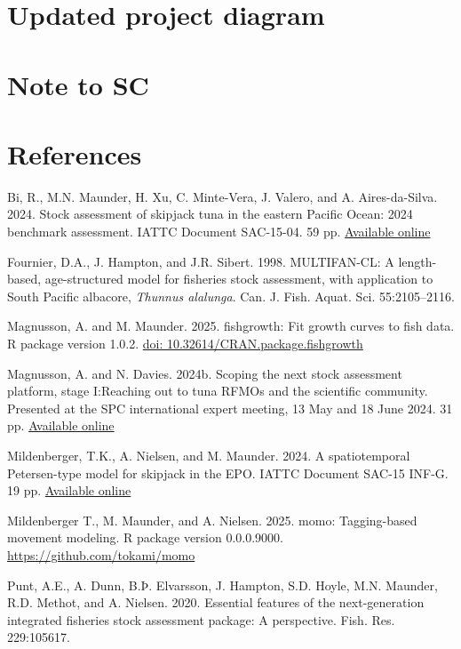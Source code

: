\documentclass{SCreport}
\newcommand\blob
{https://github.com/PacificCommunity/ofp-sam-transition-plan/blob/main}
\newcommand\present{\blob/presentations}
\begin{document}
\section{Updated project diagram}

\section{Note to SC}

\section{References}

\sloppy\setlength{}

\begin{description}\setlength\itemsep{0ex}
  \item Bi, R., M.N. Maunder, H. Xu, C. Minte-Vera, J. Valero, and A.
  Aires-da-Silva. 2024. Stock assessment of skipjack tuna in the eastern Pacific
  Ocean: 2024 benchmark assessment. IATTC Document SAC-15-04. 59 pp.
  \href{https://www.iattc.org/GetAttachment/f57dece1-81ba-4771-8fa8-3362320a368%
    a/SAC-15-04_Skipjack-tuna-benchmark-assessment-2024.pdf}{Available online}
  \item Fournier, D.A., J. Hampton, and J.R. Sibert. 1998. MULTIFAN-CL: A
  length-based, age-structured model for fisheries stock assessment, with
  application to South Pacific albacore, \textit{Thunnus alalunga}. Can. J.
  Fish. Aquat. Sci. 55:2105--2116.
  \item Magnusson, A. and M. Maunder. 2025. fishgrowth: Fit growth curves to
  fish data. R package version 1.0.2.
  \href{https://doi.org/10.32614/CRAN.package.fishgrowth}
  {doi: 10.32614/CRAN.package.fishgrowth}
  \item Magnusson, A. and N. Davies. 2024b. Scoping the next stock assessment
  platform, stage I:\linebreak Reaching out to tuna RFMOs and the scientific
  community. Presented at the SPC international expert meeting, 13 May and 18
  June 2024. 31 pp.
  \href{\present/2024_05_13_experts_scoping/2024_05_13_experts_scoping.pdf}
  {Available online}
  \item Mildenberger, T.K., A. Nielsen, and M. Maunder. 2024. A spatiotemporal
  Petersen-type model for skipjack in the EPO. IATTC Document SAC-15 INF-G. 19
  pp. \href{https://www.iattc.org/GetAttachment/f8eacbc8-92b8-434d-a331-bdc733d%
    c1bc6/SAC-15-INF-G_Spatiotemporal-tagging-model-for-skipjack-in-the-EPO.pdf}
  {Available online}
  \item Mildenberger T., M. Maunder, and A. Nielsen. 2025. momo: Tagging-based
  movement modeling. R package version 0.0.0.9000.
  \href{https://github.com/tokami/momo}{https://github.com/tokami/momo}
  \item Punt, A.E., A. Dunn, B.Þ. Elvarsson, J. Hampton, S.D. Hoyle, M.N.
  Maunder, R.D. Methot, and A. Nielsen. 2020. Essential features of the
  next-generation integrated fisheries stock assessment package: A perspective.
  Fish. Res. 229:105617.
\end{description}
\end{document}
